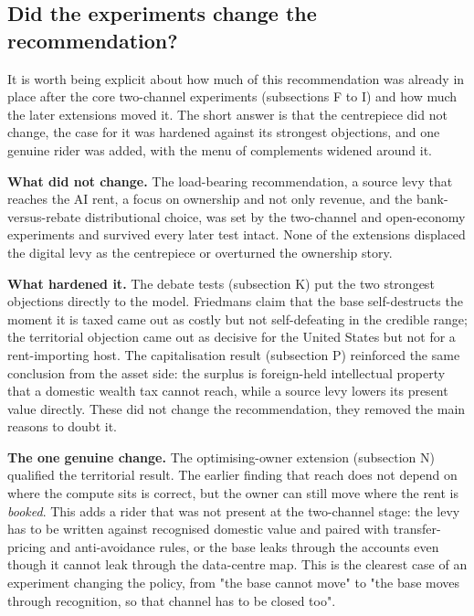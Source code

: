\documentclass[11pt]{article}
\begin{document}
\hypertarget{did-the-experiments-change-the-recommendation}{%
\subsection{Did the experiments change the
recommendation?}\label{did-the-experiments-change-the-recommendation}}

It is worth being explicit about how much of this recommendation was
already in place after the core two-channel experiments (subsections F
to I) and how much the later extensions moved it. The short answer is
that the centrepiece did not change, the case for it was hardened
against its strongest objections, and one genuine rider was added, with
the menu of complements widened around it.

\textbf{What did not change.} The load-bearing recommendation, a source
levy that reaches the AI rent, a focus on ownership and not only
revenue, and the bank-versus-rebate distributional choice, was set by
the two-channel and open-economy experiments and survived every later
test intact. None of the extensions displaced the digital levy as the
centrepiece or overturned the ownership story.

\textbf{What hardened it.} The debate tests (subsection K) put the two
strongest objections directly to the model. Friedman\textquotesingle s
claim that the base self-destructs the moment it is taxed came out as
costly but not self-defeating in the credible range; the territorial
objection came out as decisive for the United States but not for a
rent-importing host. The capitalisation result (subsection P) reinforced
the same conclusion from the asset side: the surplus is foreign-held
intellectual property that a domestic wealth tax cannot reach, while a
source levy lowers its present value directly. These did not change the
recommendation, they removed the main reasons to doubt it.

\textbf{The one genuine change.} The optimising-owner extension
(subsection N) qualified the territorial result. The earlier finding
that reach does not depend on where the compute sits is correct, but the
owner can still move where the rent is \emph{booked}. This adds a rider
that was not present at the two-channel stage: the levy has to be
written against recognised domestic value and paired with
transfer-pricing and anti-avoidance rules, or the base leaks through the
accounts even though it cannot leak through the data-centre map. This is
the clearest case of an experiment changing the policy, from "the base
cannot move" to "the base moves through recognition, so that channel has
to be closed too".
\end{document}
